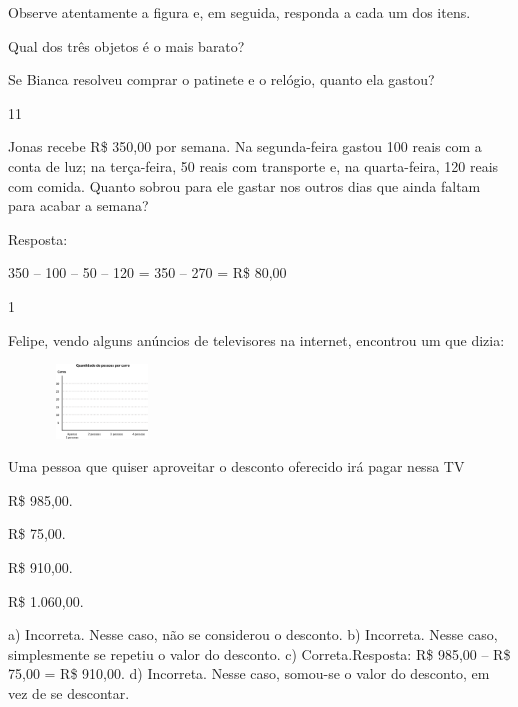 \begin{escolha}
{Observe atentamente a figura e, em seguida, responda a cada um dos itens.

\begin{escolha}

\item
  Qual dos três objetos é o mais barato?

\item
  Se Bianca resolveu comprar o patinete e o relógio, quanto ela gastou?

\num{11}

Jonas recebe R\$ 350,00 por semana. Na segunda-feira gastou 100 reais
com a conta de luz; na terça-feira, 50 reais com transporte e, na quarta-feira, 120 reais com comida. Quanto sobrou para ele gastar nos outros
dias que ainda faltam para acabar a semana?


Resposta:

350 -- 100 -- 50 -- 120 = 350 -- 270 = R\$ 80,00


\num{1}

Felipe, vendo alguns anúncios de televisores na internet, encontrou um que dizia:


\includegraphics[width=1.95850in,height=0.77507in]{media/image81.png}

Uma pessoa que quiser aproveitar o desconto oferecido irá pagar nessa TV

\begin{escolha}

\item
  R\$ 985,00.
\item
  R\$ 75,00.
\item
  R\$ 910,00.
\item
  R\$ 1.060,00.
\end{escolha}

a) Incorreta. Nesse caso, não se considerou o desconto.
b) Incorreta. Nesse caso, simplesmente se repetiu o valor do desconto.
c) Correta.Resposta: R\$ 985,00 -- R\$ 75,00 = R\$ 910,00.
d) Incorreta. Nesse caso, somou-se o valor do desconto, em vez de se descontar.


\end{escolha}}
\end{escolha}
